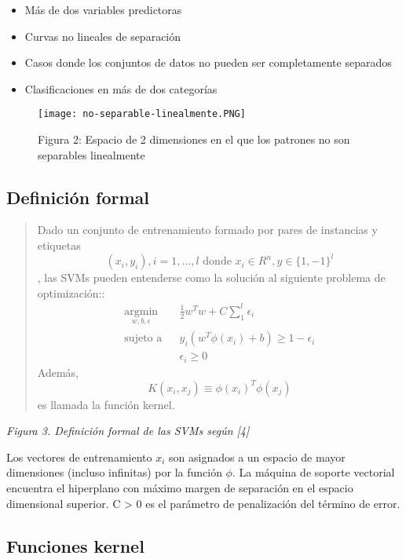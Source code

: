 \documentclass[11pt]{article}
\makeatletter
\def\maxwidth{\ifdim\Gin@nat@width>\linewidth\linewidth
    \else\Gin@nat@width\fi}
\let\Oldincludegraphics\includegraphics
\renewcommand{\includegraphics}[1]{\Oldincludegraphics[width=.8\maxwidth]{#1}}
\providecommand{\tightlist}{%
      \setlength{\itemsep}{0pt}\setlength{\parskip}{0pt}}
\makeatother
\begin{document}
\begin{itemize}
\tightlist
\item
  Más de dos variables predictoras
\item
  Curvas no lineales de separación
\item
  Casos donde los conjuntos de datos no pueden ser completamente
  separados
\item
  Clasificaciones en más de dos categorías
\end{itemize}

\begin{figure}[h]
\centering
\texttt{[image: no-separable-linealmente.PNG]}
\caption{Figura 2: Espacio de 2 dimensiones en el que los patrones no
son separables linealmente}
\end{figure}

\subsection{Definición formal}\label{definiciuxf3n-formal}

\begin{quote}
Dado un conjunto de entrenamiento formado por pares de instancias y
etiquetas
\[(x_i,y_i),  i=1, . . . , l \text{ donde } x_i \in R^n, y \in \{1, −1\}^l\]
, las SVMs pueden entenderse como la solución al siguiente problema de
optimización:: \[
\begin{aligned}
\underset{w,b,\epsilon}{\operatorname{argmin}} & & \frac{1}{2}w^Tw + C
\sum_1^l{\epsilon_i} \\
\text{sujeto a} & & y_i(w^T \phi(x_i) + b) \ge 1- \epsilon_i \\
& & \epsilon_i \ge 0
\end{aligned}
\] Además, \[K(x_i, x_j ) ≡ \phi(x_i)^T \phi(x_j)\] es llamada la
función kernel.
\end{quote}

\emph{Figura 3. Definición formal de las SVMs según {[}4{]}}

Los vectores de entrenamiento \(x_i\) son asignados a un espacio de
mayor dimensiones (incluso infinitas) por la función \(\phi\). La
máquina de soporte vectorial encuentra el hiperplano con máximo margen
de separación en el espacio dimensional superior. C \textgreater{} 0 es
el parámetro de penalización del término de error.

\subsection{Funciones kernel}\label{funciones-kernel}
\end{document}
